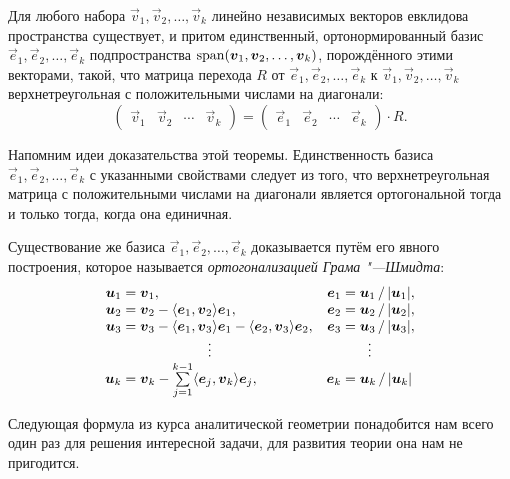 \begin{theorem}
	Для любого набора $\vec{v}_1, \vec{v}_2, \ldots, \vec{v}_k$ линейно независимых векторов евклидова пространства существует, и притом единственный, ортонормированный базис $\vec{e}_1, \vec{e}_2, \ldots, \vec{e}_k$ подпространства $\operatorname{span}(\boldsymbol{v}_1, \boldsymbol{v}_2, \ldots, \boldsymbol{v}_k)$, порождённого этими векторами, такой, что матрица перехода $R$ от $\vec{e}_1, \vec{e}_2, \ldots, \vec{e}_k$ к $\vec{v}_1, \vec{v}_2, \ldots, \vec{v}_k$ верхнетреугольная с положительными числами на диагонали:
	\[
		\begin{pmatrix}
			\vec{v}_1 & \vec{v}_2 & \cdots & \vec{v}_k
		\end{pmatrix} =
		\begin{pmatrix}
			\vec{e}_1 & \vec{e}_2 & \cdots & \vec{e}_k
		\end{pmatrix} \cdot R.
	\]
\end{theorem}

Напомним идеи доказательства этой теоремы. Единственность базиса $\vec{e}_1, \vec{e}_2, \ldots, \vec{e}_k$ с указанными свойствами следует из того, что верхнетреугольная матрица с положительными числами на диагонали является ортогональной тогда и только тогда, когда она единичная.

Существование же базиса $\vec{e}_1, \vec{e}_2, \ldots, \vec{e}_k$ доказывается путём его явного построения, которое называется \textit{ортогонализацией Грама "---Шмидта}:
\[
	\begin{array}{r@{\;}l@{\quad}r@{\;}l}
		\vec{u}_1 = & \vec{v}_1, & \vec{e}_1 = & \vec{u}_1\,/\,|\vec{u}_1|, \\
		\vec{u}_2 = & \vec{v}_2 - \langle \vec{e}_1, \vec{v}_2 \rangle \vec{e}_1, & \vec{e}_2 = & \vec{u}_2\,/\,|\vec{u}_2|, \\
		\vec{u}_3 = & \vec{v}_3 - \langle \vec{e}_1, \vec{v}_3 \rangle \vec{e}_1 - \langle \vec{e}_2, \vec{v}_3 \rangle \vec{e}_2, & \vec{e}_3 = & \vec{u}_3\,/\,|\vec{u}_3|, \\
			& \hspace{1.7cm} \vdots & & \hspace{.2cm} \vdots \\
		\vec{u}_k = & \vec{v}_k - \sum\limits_{j=1}^{k-1} \langle \vec{e}_j, \vec{v}_k \rangle \vec{e}_j, & \vec{e}_k = & \vec{u}_k\,/\,|\vec{u}_k|
	\end{array}
\]

Следующая формула из курса аналитической геометрии понадобится нам всего один раз для решения интересной задачи, для развития теории она нам не пригодится.

